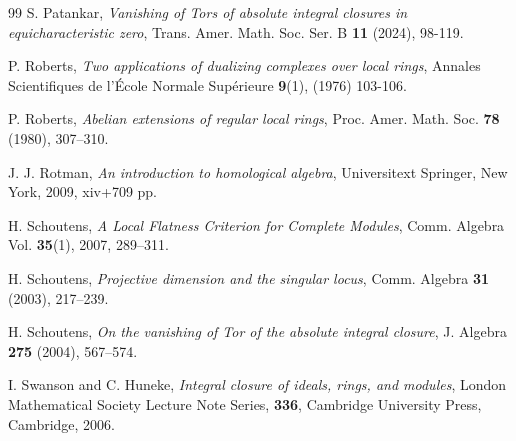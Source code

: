 \documentclass[11pt,a4paper]{amsart}
\numberwithin{equation}{section}
\theoremstyle{definition}
\theoremstyle{remark}
\begin{document}
\begin{thebibliography}{99}
 S. Patankar,
\emph{Vanishing of Tors of absolute integral closures in equicharacteristic zero}, Trans. Amer. Math. Soc. Ser. B \textbf{11} (2024), 98-119.
		
 P. Roberts, \emph{Two applications of dualizing complexes over local rings}, Annales Scientifiques de l'École Normale Supérieure {\bf 9}(1), (1976) 103-106.

	P. Roberts, {\it Abelian extensions of regular local rings}, Proc. Amer. Math. Soc. {\bf78} (1980), 307--310.
		
		
			
J. J. Rotman,
\emph{An introduction to homological algebra},  Universitext
		Springer, New York, 2009, xiv+709 pp.
		
 H. Schoutens, \emph{A Local Flatness Criterion for Complete Modules}, Comm. Algebra Vol. {\bf 35}(1), 2007, 289–311.
		
 H. Schoutens, \emph{Projective dimension and the singular locus}, Comm. Algebra {\bf 31} (2003), 217–239.
		
 H. Schoutens, \emph{On the vanishing of Tor of the absolute integral closure}, J. Algebra {\bf 275} (2004), 567–574.
		
 I. Swanson and C. Huneke, \emph{Integral closure of ideals, rings, and modules}, London Mathematical Society Lecture Note Series, {\bf 336}, Cambridge University Press, Cambridge, 2006.
		
	\end{thebibliography}
	
\end{document}
